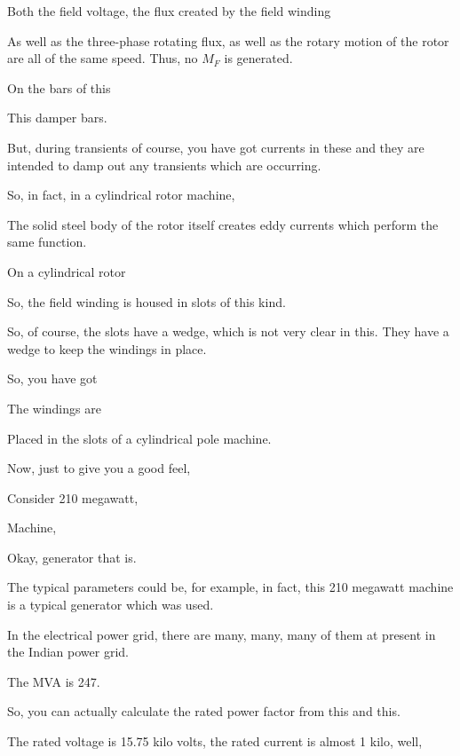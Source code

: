 \documentclass{article}
\begin{document}
Both the field voltage, the flux created by the field winding

As well as the three-phase rotating flux, as well as the rotary motion of the rotor are all of the same speed. Thus, no $M_F$ is generated.

On the bars of this

This damper bars.

But, during transients of course, you have got currents in these and they are intended to damp out any transients which are occurring.

So, in fact, in a cylindrical rotor machine,

The solid steel body of the rotor itself creates eddy currents which perform the same function.

On a cylindrical rotor

So, the field winding is housed in slots of this kind.

So, of course, the slots have a wedge, which is not very clear in this. They have a wedge to keep the windings in place.

So, you have got

The windings are

Placed in the slots of a cylindrical pole machine.



Now, just to give you a good feel,

Consider 210 megawatt,

Machine,

Okay, generator that is.

The typical parameters could be, for example, in fact, this 210 megawatt machine is a typical generator which was used.

In the electrical power grid, there are many, many, many of them at present in the Indian power grid.

The MVA is 247.

So, you can actually calculate the rated power factor from this and this.

The rated voltage is 15.75 kilo volts, the rated current is almost 1 kilo, well,
\end{document}
